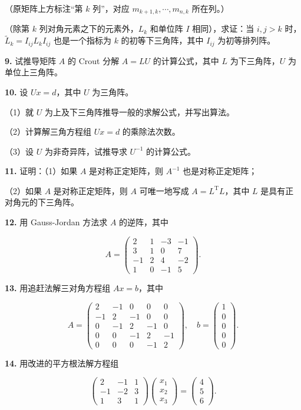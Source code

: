 \documentclass[
  10pt,
  fontset=fandol]{ctexart}
\begin{document}
（原矩阵上方标注``第 \(k\) 列''，对应 \(m_{k+1,k},\cdots,m_{n,k}\)
所在列。）

（除第 \(k\) 列对角元素之下的元素外，\(L_k\) 和单位阵 \(I\)
相同），求证：当 \(i,j>k\) 时，\(\widetilde L_k=I_{ij}L_kI_{ij}\)
也是一个指标为 \(k\) 的初等下三角阵，其中 \(I_{ij}\) 为初等排列阵。

\textbf{9.} 试推导矩阵 \(A\) 的 Crout 分解 \(A=LU\) 的计算公式，其中
\(L\) 为下三角阵，\(U\) 为单位上三角阵。

\textbf{10.} 设 \(Ux=d\)，其中 \(U\) 为三角阵。

（1）就 \(U\) 为上及下三角阵推导一般的求解公式，并写出算法。

（2）计算解三角方程组 \(Ux=d\) 的乘除法次数。

（3）设 \(U\) 为非奇异阵，试推导求 \(U^{-1}\) 的计算公式。

\textbf{11.} 证明：（1）如果 \(A\) 是对称正定矩阵，则 \(A^{-1}\)
也是对称正定矩阵；

（2）如果 \(A\) 是对称正定矩阵，则 \(A\) 可唯一地写成
\(A=L^{\mathrm T}L\)，其中 \(L\) 是具有正对角元的下三角阵。

\textbf{12.} 用 Gauss-Jordan 方法求 \(A\) 的逆阵，其中

\[
A=\begin{pmatrix}
2&1&-3&-1\\
3&1&0&7\\
-1&2&4&-2\\
1&0&-1&5
\end{pmatrix}.
\]

\textbf{13.} 用追赶法解三对角方程组 \(Ax=b\)，其中

\[
A=\begin{pmatrix}
2&-1&0&0&0\\
-1&2&-1&0&0\\
0&-1&2&-1&0\\
0&0&-1&2&-1\\
0&0&0&-1&2
\end{pmatrix},\quad
b=\begin{pmatrix}1\\0\\0\\0\\0\end{pmatrix}.
\]

\textbf{14.} 用改进的平方根法解方程组

\[
\begin{pmatrix}
2&-1&1\\
-1&-2&3\\
1&3&1
\end{pmatrix}
\begin{pmatrix}x_1\\x_2\\x_3\end{pmatrix}
=\begin{pmatrix}4\\5\\6\end{pmatrix}.
\]
\end{document}
